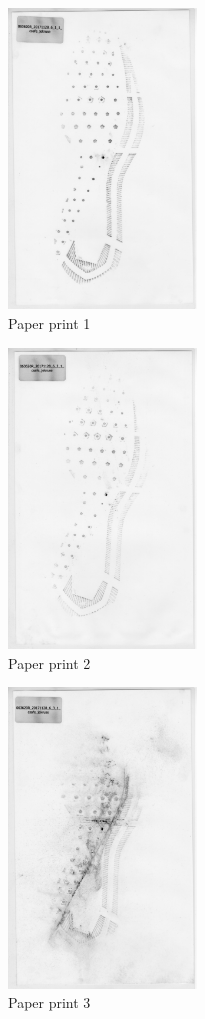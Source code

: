 \begin{figure}[!htp]
\centering
\includegraphics[width=5cm]{Baseline_Paper_1}
\caption{Paper print 1}
\label{Image 19}
\end{figure}

\begin{figure}[!htp]
\centering
\includegraphics[width=5cm]{Baseline_Paper_2}
\caption{Paper print 2}
\label{Image 20}
\end{figure}

\begin{figure}[!htp]
\centering
\includegraphics[width=5cm]{Baseline_Paper_3}
\caption{Paper print 3}
\label{Image 21}
\end{figure}

